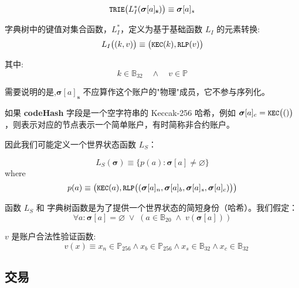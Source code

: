 \documentclass[9pt,oneside]{amsart}
\begin{document}
\begin{multicols}{2}
\begin{equation}
\texttt{\small TRIE}\big(L_I^*(\boldsymbol{\sigma}[a]_\mathbf{s})\big) \equiv \boldsymbol{\sigma}[a]_s
\end{equation}

字典树中的键值对集合函数，$L_I^*$，定义为基于基础函数 $L_I$ 的元素转换:
\begin{equation}
L_I\big( (k, v) \big) \equiv \big(\texttt{\small KEC}(k), \texttt{\small RLP}(v)\big)
\end{equation}

其中:
\begin{equation}
k \in \mathbb{B}_{32} \quad \wedge \quad v \in \mathbb{P}
\end{equation}

需要说明的是,$\boldsymbol{\sigma}[a]_\mathbf{s}$ 不应算作这个账户的"物理"成员，它不参与序列化。

如果 \textbf{codeHash} 字段是一个空字符串的 Keccak-256 哈希，例如 $\boldsymbol{\sigma}[a]_c = \texttt{\small KEC}\big(()\big)$，则表示对应的节点表示一个简单账户，有时简称非合约账户。


因此我们可能定义一个世界状态函数 $L_S$：

\begin{equation}
L_S(\boldsymbol{\sigma}) \equiv \{ p(a): \boldsymbol{\sigma}[a] \neq \varnothing \}
\end{equation}
where
\begin{equation}
p(a) \equiv  \big(\texttt{\small KEC}(a), \texttt{\small RLP}\big( (\boldsymbol{\sigma}[a]_n, \boldsymbol{\sigma}[a]_b, \boldsymbol{\sigma}[a]_s, \boldsymbol{\sigma}[a]_c) \big) \big)
\end{equation}

函数 $L_S$ 和 字典树函数是为了提供一个世界状态的简短身份（哈希）。我们假定：
\begin{equation}
\forall a: \boldsymbol{\sigma}[a] = \varnothing \; \vee \; (a \in \mathbb{B}_{20} \; \wedge \; v(\boldsymbol{\sigma}[a]))
\end{equation}

$v$ 是账户合法性验证函数:
\begin{equation}
\quad v(x) \equiv x_n \in \mathbb{P}_{256} \wedge x_b \in \mathbb{P}_{256} \wedge x_s \in \mathbb{B}_{32} \wedge x_c \in \mathbb{B}_{32}
\end{equation}


\subsection{交易} \label{ch:transaction}


\end{multicols}
\end{document}
